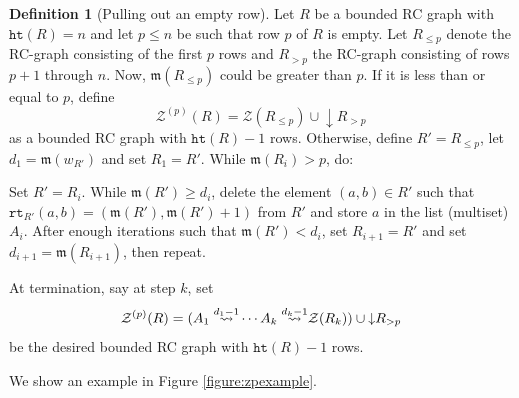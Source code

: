\documentclass{amsart}
\theoremstyle{definition}
\newtheorem{definition}[lemma]{Definition}
\theoremstyle{remark}
\numberwithin{equation}{subsection}
\newcommand{\wof}[1]{w_{#1}}
\newcommand{\rtt}{\mathtt{rt}}
\newcommand{\zeromap}{\mathcal{Z}}
\newcommand{\hr}{\mathtt{ht}}
\newcommand{\maxd}{\mathfrak{m}}
\begin{document}
\begin{definition}[Pulling out an empty row]
Let $R$ be a bounded RC graph with $\hr(R)=n$ and let $p\leq n$ be such that row $p$ of $R$ is empty. Let $R_{\leq p}$ denote the RC-graph consisting of the first $p$ rows and $R_{>p}$ the RC-graph consisting of rows $p+1$ through $n$. Now, $\maxd(R_{\leq p})$ could be greater than $p$. If it is less than or equal to $p$, define 
$$\zeromap^{(p)}(R) = \zeromap(R_{\leq p})\cup {\downarrow R_{>p}}$$ 
as a bounded RC graph with $\hr(R)-1$ rows. Otherwise, define $R' = R_{\leq p}$, let $d_1 = \maxd(\wof{R'})$ and set $R_1 = R'$. While $\maxd(R_i) > p$, do:

Set $R'=R_i$. While $\maxd(R') \geq d_i$, delete the element $(a,b)\in R'$ such that $\rtt_{R'}(a,b)=(\maxd(R'),\maxd(R')+1)$ from $R'$ and store $a$ in the list (multiset) $A_i$. After enough iterations such that $\maxd(R')<d_i$, set $R_{i+1}= R'$ and set $d_{i+1}= \maxd(R_{i+1})$, then repeat. 

At termination, say at step $k$, set
$$\zeromap^{(p)}(R) = (\ins{d_1 - 1}{A_1}\cdots\ins{d_k - 1}{A_k}\zeromap(R_k))\cup {\downarrow} R_{>p}$$
be the desired bounded RC graph with $\hr(R)-1$ rows.

We show an example in Figure \ref{figure:zpexample}.
\end{definition}
\end{document}
